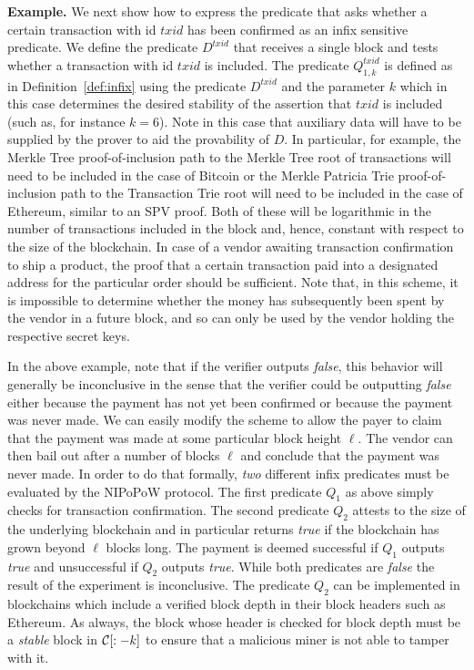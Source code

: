 \noindent\textbf{Example.}
We next show how to express the predicate that asks whether a certain
transaction with id $txid$ has been confirmed as an infix sensitive predicate.
We define the predicate $D^{txid}$ that receives a single block and tests
whether a transaction with id $txid$ is included. The predicate $Q^{txid}_{1,
k}$ is defined as in Definition~\ref{def:infix} using the predicate $D^{txid}$
and the parameter $k$ which in this case determines the desired stability of the
assertion that $txid$ is included (such as, for instance $k = 6$). Note in this
case that auxiliary data will have to be supplied by the prover to aid the
provability of $D$. In particular, for example, the Merkle Tree
proof-of-inclusion path to the Merkle Tree root of transactions will need to be
included in the case of Bitcoin or the Merkle Patricia Trie proof-of-inclusion
path to the Transaction Trie root will need to be included in the case of
Ethereum, similar to an SPV proof. Both of these will be logarithmic in the
number of transactions included in the block and, hence, constant with respect
to the size of the blockchain. In case of a vendor awaiting transaction
confirmation to ship a product, the proof that a certain transaction paid into
a designated address for the particular order should be sufficient. Note that,
in this scheme, it is impossible to determine whether the money has subsequently
been spent by the vendor in a future block, and so can only be used by the
vendor holding the respective secret keys.

In the above example, note that if the verifier outputs \emph{false}, this
behavior will generally be inconclusive in the sense that the verifier could be
outputting \emph{false} either because the payment has not yet been confirmed or
because the payment was never made. We can easily modify the scheme to allow the
payer to claim that the payment was made at some particular block height $\ell$.
The vendor can then bail out after a number of blocks $\ell$ and conclude that
the payment was never made. In order to do that formally, \emph{two} different
infix predicates must be evaluated by the NIPoPoW protocol. The first predicate
$Q_1$ as above simply checks for transaction confirmation. The second predicate
$Q_2$ attests to the size of the underlying blockchain and in particular returns
\emph{true} if the blockchain has grown beyond $\ell$ blocks long. The payment
is deemed successful if $Q_1$ outputs \emph{true} and unsuccessful if $Q_2$
outputs \emph{true}. While both predicates are \emph{false} the result of the
experiment is inconclusive. The predicate $Q_2$ can be implemented in
blockchains which include a verified block depth in their block headers such as
Ethereum. As always, the block whose header is checked for block depth must be
a \emph{stable} block in $\mathcal{C}[:-k]$ to ensure that a malicious miner is not
able to tamper with it.

